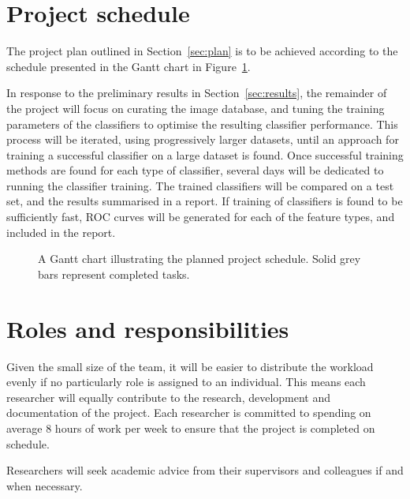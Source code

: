 \documentclass[11pt]{scrartcl}
\begin{document}
    \section{Project schedule} {
    \label{sec:schedule}

        The project plan outlined in Section~\ref{sec:plan} is to be achieved
        according to the schedule presented in the Gantt chart in
        Figure~\ref{gantt:proposal}.

        In response to the preliminary results in Section~\ref{sec:results}, the
        remainder of the project will focus on curating the image database,
        and tuning the training parameters of the classifiers to optimise the
        resulting classifier performance. This process will be iterated, using
        progressively larger datasets, until an approach for training a
        successful classifier on a large dataset is found. Once successful
        training methods are found for each type of classifier, several days
        will be dedicated to running the classifier training. The trained
        classifiers will be compared on a test set, and the results summarised
        in a report. If training of classifiers is found to be sufficiently
        fast, ROC curves will be generated for each of the feature types, and
        included in the report.

        \begin{figure}[H]
            \makebox[\textwidth][c]{\resizebox{0.95\paperwidth}{!}{}}
            \caption[Project Schedule] {
                A Gantt chart illustrating the planned project schedule.
                Solid grey bars represent completed tasks.
            }
            \label{gantt:proposal}
        \end{figure}
    }

    \section{Roles and responsibilities} {

        Given the small size of the team, it will be easier to distribute the workload evenly if no particularly role is assigned to an individual. This means each researcher will equally contribute to the research, development and documentation of the project. Each researcher is committed to spending on average 8 hours of work per week to ensure that the project is completed on schedule.

        Researchers will seek academic advice from their supervisors and colleagues if and when necessary.
    }
\end{document}
